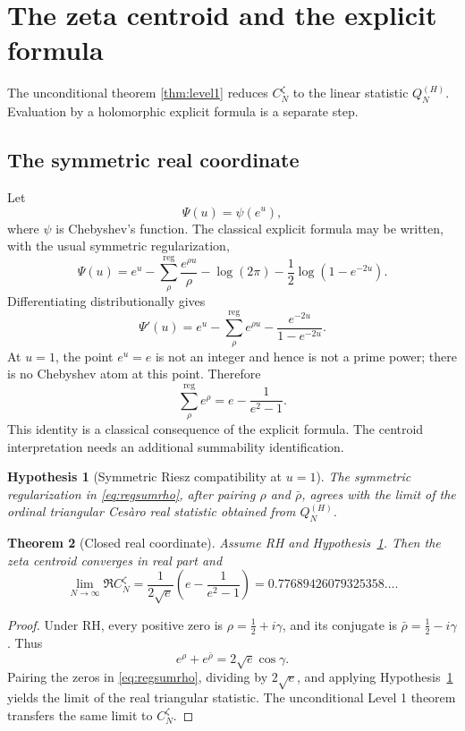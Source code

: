 \documentclass[11pt]{article}
\newtheorem{theorem}{Theorem}[section]
\newtheorem{hypothesis}[theorem]{Hypothesis}
\theoremstyle{definition}
\theoremstyle{remark}
\begin{document}
\section{The zeta centroid and the explicit formula}\label{sec:explicit}

The unconditional theorem \ref{thm:level1} reduces $C_N^{\zeta}$ to the linear statistic $Q_N^{(H)}$.  Evaluation by a holomorphic explicit formula is a separate step.

\subsection{The symmetric real coordinate}
Let
\[
\Psi(u)=\psi(e^u),
\]
where $\psi$ is Chebyshev's function.  The classical explicit formula may be written, with the usual symmetric regularization,
\begin{equation}\label{eq:explicitPsi}
\Psi(u)=e^u-
\sum_{\rho}^{\mathrm{reg}}\frac{e^{\rho u}}{\rho}
-\log(2\pi)-\frac12\log(1-e^{-2u}).
\end{equation}
Differentiating distributionally gives
\begin{equation}\label{eq:explicitDerivative}
\Psi'(u)=e^u-
\sum_{\rho}^{\mathrm{reg}}e^{\rho u}
-\frac{e^{-2u}}{1-e^{-2u}}.
\end{equation}
At $u=1$, the point $e^u=e$ is not an integer and hence is not a prime power; there is no Chebyshev atom at this point.  Therefore
\begin{equation}\label{eq:regsumrho}
\boxed{
\sum_{\rho}^{\mathrm{reg}}e^{\rho}
=e-\frac1{e^2-1}.
}
\end{equation}
This identity is a classical consequence of the explicit formula.  The centroid interpretation needs an additional summability identification.

\begin{hypothesis}[Symmetric Riesz compatibility at $u=1$]\label{hyp:SR}
The symmetric regularization in \eqref{eq:regsumrho}, after pairing $\rho$ and $\bar\rho$, agrees with the limit of the ordinal triangular Cesàro real statistic obtained from $Q_N^{(H)}$.
\end{hypothesis}

\begin{theorem}[Closed real coordinate]\label{thm:realconstant}
Assume RH and Hypothesis~\ref{hyp:SR}.  Then the zeta centroid converges in real part and
\begin{equation}\label{eq:realclosed}
\boxed{
\lim_{N\to\infty}\Re C_N^{\zeta}
=\frac{1}{2\sqrt e}\left(e-\frac1{e^2-1}\right)
=0.77689426079325358\ldots.
}
\end{equation}
\end{theorem}
\begin{proof}
Under RH, every positive zero is $\rho=\tfrac12+i\gamma$, and its conjugate is $\bar\rho=\tfrac12-i\gamma$.  Thus
\[
e^{\rho}+e^{\bar\rho}=2\sqrt e\cos\gamma.
\]
Pairing the zeros in \eqref{eq:regsumrho}, dividing by $2\sqrt e$, and applying Hypothesis~\ref{hyp:SR} yields the limit of the real triangular statistic.  The unconditional Level 1 theorem transfers the same limit to $C_N^{\zeta}$.
\end{proof}
\end{document}

